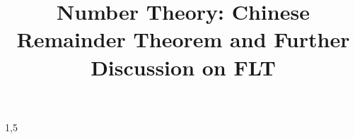 \documentclass[a4paper,12pt]{article}
\begin{document}

\title{Number Theory: Chinese Remainder Theorem and Further Discussion on FLT}
\newcommand\event{S.3,4 Elite Mathematics Training}
\newcommand\learningobjective{
\item Learn Chinese Remainder Theorem and Chicken McNugget Theorem
\item Further usage of Euler's Theorem with CRT
}

\myfrontpage


\mynewpage



\begin{question}[]{1,5}
    
    
    
    
    
    
    
    
    
\end{question}
\end{document}
